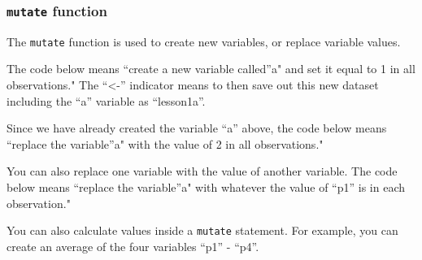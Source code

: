 \documentclass[]{book}
\newenvironment{Shaded}{\begin{snugshade}}{\end{snugshade}}
\newcommand{\DataTypeTok}[1]{\textcolor[rgb]{0.13,0.29,0.53}{#1}}
\newcommand{\DecValTok}[1]{\textcolor[rgb]{0.00,0.00,0.81}{#1}}
\newcommand{\KeywordTok}[1]{\textcolor[rgb]{0.13,0.29,0.53}{\textbf{#1}}}
\newcommand{\NormalTok}[1]{#1}
\newcommand{\OperatorTok}[1]{\textcolor[rgb]{0.81,0.36,0.00}{\textbf{#1}}}
\newcommand{\StringTok}[1]{\textcolor[rgb]{0.31,0.60,0.02}{#1}}
\begin{document}
\hypertarget{mutate-function-1}{%
\subsubsection{\texorpdfstring{\texttt{mutate}
function}{mutate function}}\label{mutate-function-1}}

The \texttt{mutate} function is used to create new variables, or replace
variable values.

The code below means ``create a new variable called''a" and set it equal
to 1 in all observations." The ``\textless-'' indicator means to then
save out this new dataset including the ``a'' variable as ``lesson1a''.

\begin{Shaded}
\end{Shaded}

Since we have already created the variable ``a'' above, the code below
means ``replace the variable''a" with the value of 2 in all
observations."

\begin{Shaded}
\end{Shaded}

You can also replace one variable with the value of another variable.
The code below means ``replace the variable''a" with whatever the value
of ``p1'' is in each observation."

\begin{Shaded}
\end{Shaded}

You can also calculate values inside a \texttt{mutate} statement. For
example, you can create an average of the four variables ``p1'' -
``p4''.
\end{document}
